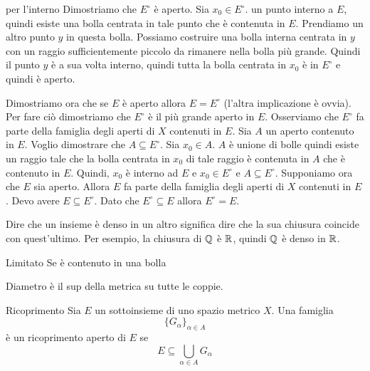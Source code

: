 \documentclass[a4paper]{article}
\begin{document}
\begin{snippetproof}{per l'interno}
    Dimostriamo che \(E^\circ\) è aperto. Sia \(x_0 \in E^\circ\).
    un punto interno a \(E\), quindi esiste una bolla centrata in tale punto che è contenuta in \(E\).
    Prendiamo un altro punto \(y\) in questa bolla. Possiamo costruire una bolla interna centrata in \(y\)
    con un raggio sufficientemente piccolo da rimanere nella bolla più grande. Quindi il punto \(y\)
    è a sua volta interno, quindi tutta la bolla centrata in \(x_0\) è in \(E^\circ\) e quindi è aperto.
    
    Dimostriamo ora che se \(E\) è aperto allora \(E=E^\circ\) (l'altra implicazione è ovvia).
    Per fare ciò dimostriamo che \(E^\circ\) è il più grande aperto in \(E\).
    Osserviamo che \(E^\circ\) fa parte della famiglia degli aperti di \(X\)
    contenuti in \(E\). Sia \(A\) un aperto contenuto in \(E\). Voglio dimostrare che \(A \subseteq E^\circ\).
    Sia \(x_0 \in A\). \(A\) è unione di bolle quindi esiste un raggio tale che la
    bolla centrata in \(x_0\) di tale raggio è contenuta in \(A\) che è contenuto in \(E\).
    Quindi, \(x_0\) è interno ad \(E\) e \(x_0 \in E^\circ\) e \(A \subseteq E^\circ\).
    Supponiamo ora che \(E\) sia aperto. Allora \(E\) fa parte della famiglia degli aperti
    di \(X\) contenuti in \(E\). Devo avere \(E \subseteq E^\circ\).
    Dato che \(E^\circ \subseteq E\) allora \(E^\circ = E\).
\end{snippetproof}


Dire che un insieme è denso in un altro significa dire che la sua chiusura coincide con quest'ultimo.
Per esempio, la chiusura di \(\mathbb{Q}\) è \(\mathbb{R}\), quindi \(\mathbb{Q}\) è denso in \(\mathbb{R}\).


\begin{snippetdefinition}{Limitato}
    Se è contenuto in una bolla
\end{snippetdefinition}

\begin{snippetdefinition}{Diametro}
    è il sup della metrica su tutte le coppie.
\end{snippetdefinition}

\begin{snippetdefinition}{Ricoprimento}
    Sia \(E\) un sottoinsieme di uno spazio metrico \(X\). Una famiglia
    \[
        \{G_\alpha\}_{\alpha \in A}
    \]
    è un ricoprimento aperto di \(E\) se
    \[
        E \subseteq \bigcup_{\alpha \in A} G_\alpha
    \]
\end{snippetdefinition}
\end{document}
